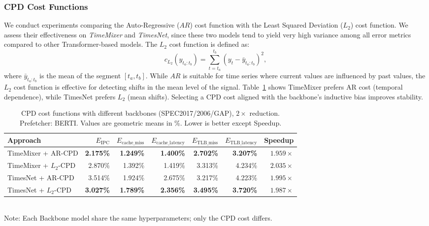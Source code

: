 \subsubsection*{CPD Cost Functions}
We conduct experiments comparing the {Auto-Regressive ($AR$)} cost function with the {Least Squared Deviation ($L_2$)} cost function. We assess their effectiveness on \textit{TimeMixer} and \textit{TimesNet}, since these two models tend to yield very high variance among all error metrics compared to other Transformer-based models. The $L_2$ cost function is defined as: $$c_{\text{$L_2$}}(y_{t_a:t_b}) = \sum_{t = t_a}^{t_b} \left( y_t - \bar{y}_{t_a:t_b} \right)^2,$$
where $\bar{y}_{t_a:t_b}$ is the mean of the segment $[t_a, t_b]$. 
While $AR$ is suitable for time series where current values are influenced by past values, the $L_2$ cost function is effective for detecting shifts in the mean level of the signal\cite{Lavielle2005}.   
Table~\ref{tab:sensitivity_cpd_onecol} shows TimeMixer prefers AR cost (temporal dependence), while TimesNet prefers $L_2$ (mean shifts). Selecting a CPD cost aligned with the backbone’s inductive bias improves stability.
\begin{table}[htbp!]
  \caption{CPD cost functions with different backbones (SPEC2017/2006/GAP), $2\times$ reduction. Prefetcher: BERTI. Values are geometric means in \%. Lower is better except Speedup.}
  \label{tab:sensitivity_cpd_onecol}
  \centering
  \setlength{\tabcolsep}{2pt}
  \begin{adjustbox}{max width=1.0\columnwidth}
  \begin{tabular}{l|rrrrrr}
  \toprule
  Approach &  $E_{\text{IPC}}$  & $E_{\text{cache\_miss}}$  &$E_{\text{cache\_latency}}$  & $E_{\text{TLB\_miss}}$    & $E_{\text{TLB\_latency}}$   & Speedup\\
  \midrule
  \footnotesize TimeMixer + AR-CPD    & \textbf{2.175\%} & \textbf{1.249\%} & \textbf{1.400\%} & \textbf{2.702\%} & \textbf{3.207\%} & $1.959\times$ \\
  \footnotesize TimeMixer + $L_2$-CPD  & 2.870\% & 1.392\% & 1.419\% & 3.313\% & 4.234\% & \textbf{$2.035\times$} \\
  \midrule
  \footnotesize TimesNet + AR-CPD     & 3.514\% & 1.924\% & 2.675\% & 3.217\% & 4.223\% & $1.995\times$ \\
   \footnotesize TimesNet + $L_2$-CPD     & \textbf{3.027\%} & \textbf{1.789\%} & \textbf{2.356\%} & \textbf{3.495\%} & \textbf{3.720\%} & $1.987\times$ \\
  \bottomrule
  \end{tabular}
  \end{adjustbox}
  \vspace{0.25ex}
  \\
  \footnotesize Note: Each Backbone model share the same hyperparameters; only the CPD cost differs.
\end{table}
